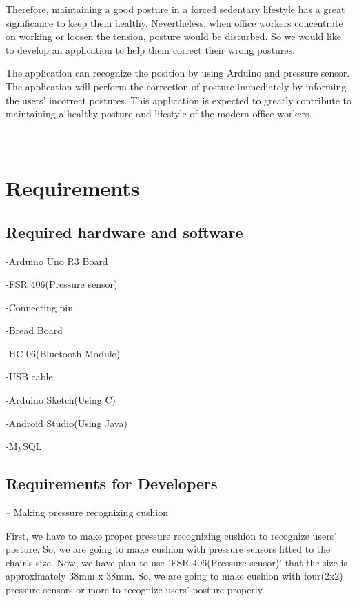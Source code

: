 \documentclass[conference]{IEEEtran}
\begin{document}
Therefore, maintaining a good posture in a forced sedentary lifestyle has a great significance to keep them healthy. Nevertheless, when office workers concentrate on working or loosen the tension, posture would be disturbed. So we would like to develop an application to help them correct their wrong postures.

The application can recognize the position by using Arduino and pressure sensor. The application will perform the correction of posture immediately by informing the users’ incorrect postures. This application is expected to greatly contribute to maintaining a healthy posture and lifestyle of the modern office workers. 
\\\\\\

\section{Requirements}

\subsection{Required hardware and software}

-Arduino Uno R3 Board

-FSR 406(Pressure sensor)

-Connecting pin

-Bread Board

-HC 06(Bluetooth Module)

-USB cable

-Arduino Sketch(Using C)

-Android Studio(Using Java)

-MySQL\\


\subsection{Requirements for Developers}

-- Making pressure recognizing cushion

First, we have to make proper pressure recognizing cushion to recognize users' posture. So, we are going to make cushion with pressure sensors fitted to the chair's size. Now, we have plan to use 'FSR 406(Pressure sensor)' that the size is approximately 38mm x 38mm. So, we are going to make cushion with four(2x2) pressure sensors or more to recognize users' posture properly.   \\
\end{document}

